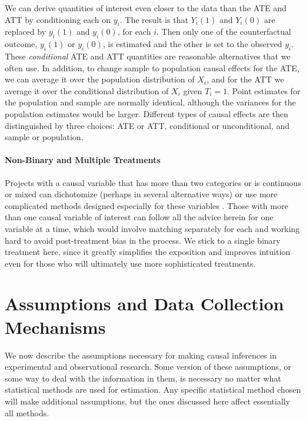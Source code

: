 \documentclass[11pt,titlepage]{article}
\begin{document}
We can derive quantities of interest even closer to the data than the
ATE and ATT by conditioning each on $y_i$.  The result is that
$Y_i(1)$ and $Y_i(0)$ are replaced by $y_i(1)$ and $y_i(0)$, for each
$i$.  Then only one of the counterfactual outcome, $y_i(1)$ or
$y_i(0)$, is estimated and the other is set to the observed $y_i$.
These \emph{conditional} ATE and ATT quantities are reasonable
alternatives that we often use.  In addition, to change sample to
population causal effects for the ATE, we can average it over the
population distribution of $X_i$, and for the ATT we average it over
the conditional distribution of $X_i$ given $T_i=1$. Point estimates
for the population and sample are normally identical, although the
variances for the population estimates would be larger.  Different
types of causal effects are then distinguished by three choices: ATE
or ATT, conditional or unconditional, and sample or population.

\paragraph{Non-Binary and Multiple Treatments}

Projects with a causal variable that has more than two categories or
is continuous or mixed can dichotomize (perhaps in several
alternative ways) or use more complicated methods designed especially
for these variables \citep{ImaDyk04}.  Those with more than one causal
variable of interest can follow all the advice herein for one variable
at a time, which would involve matching separately for each and
working hard to avoid post-treatment bias in the process.  We stick to
a single binary treatment here, since it greatly simplifies the
exposition and improves intuition even for those who will ultimately
use more sophisticated treatments.

\section{Assumptions and Data Collection Mechanisms}

We now describe the assumptions necessary for making causal inferences
in experimental and observational research.  Some version of these
assumptions, or some way to deal with the information in them, is
necessary no matter what statistical methods are used for estimation.
Any specific statistical method chosen will make additional
assumptions, but the ones discussed here affect essentially all
methods.
\end{document}
